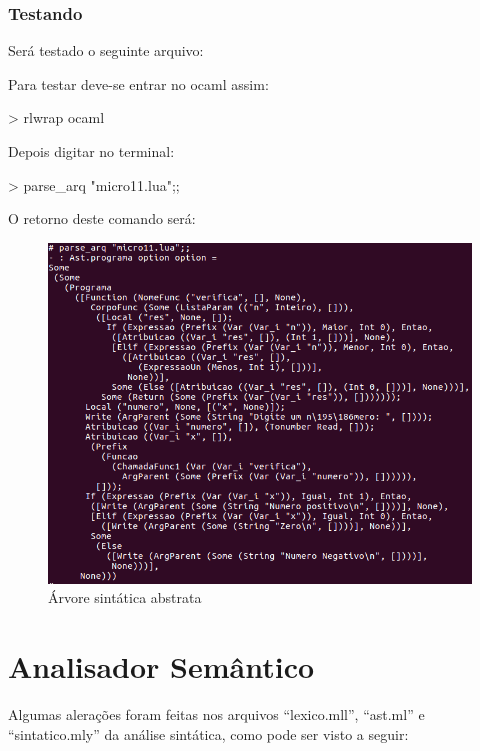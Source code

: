 \documentclass[12pt,a4paper]{report}
\begin{document}
\subsubsection{Testando}

Será testado o seguinte arquivo:




Para testar deve-se entrar no ocaml assim:

\begin{terminal}
> rlwrap ocaml
\end{terminal}

Depois digitar no terminal:

\begin{terminal}
> parse_arq "micro11.lua";;
\end{terminal}

O retorno deste comando será:

\begin{figure}[!htb]
\centering
\includegraphics[scale=0.64]{Imagens/arvoremicro11.png}
\caption{Árvore sintática abstrata}
\label{arvoremicro11}
\end{figure}


\section{Analisador Semântico}

Algumas alerações foram feitas nos arquivos ``lexico.mll'', ``ast.ml'' e ``sintatico.mly'' da análise sintática, como pode ser visto a seguir:
\end{document}
